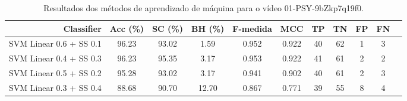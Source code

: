 \begin{table}[!htb]
\centering
\caption{Resultados dos métodos de aprendizado de máquina para o vídeo 01-PSY-9bZkp7q19f0.}
\label{tab:01-PSY-9bZkp7q19f0}
\begin{tabular}{r|c|c|c|c|c|c|c|c|c|c}
\hline\hline
Classifier & Acc (\%) & SC (\%) & BH (\%) & F-medida & MCC & TP & TN & FP & FN \\ \hline
SVM Linear 0.6 + SS 0.1 & 96.23 & 93.02 & 1.59 & 0.952 & 0.922 & 40 & 62 & 1 & 3 \\ 
SVM Linear 0.4 + SS 0.3 & 96.23 & 95.35 & 3.17 & 0.953 & 0.922 & 41 & 61 & 2 & 2 \\ 
SVM Linear 0.5 + SS 0.2 & 95.28 & 93.02 & 3.17 & 0.941 & 0.902 & 40 & 61 & 2 & 3 \\ 
SVM Linear 0.3 + SS 0.4 & 88.68 & 90.70 & 12.70 & 0.867 & 0.771 & 39 & 55 & 8 & 4 \\ 
\hline\hline
\end{tabular}
\end{table}
